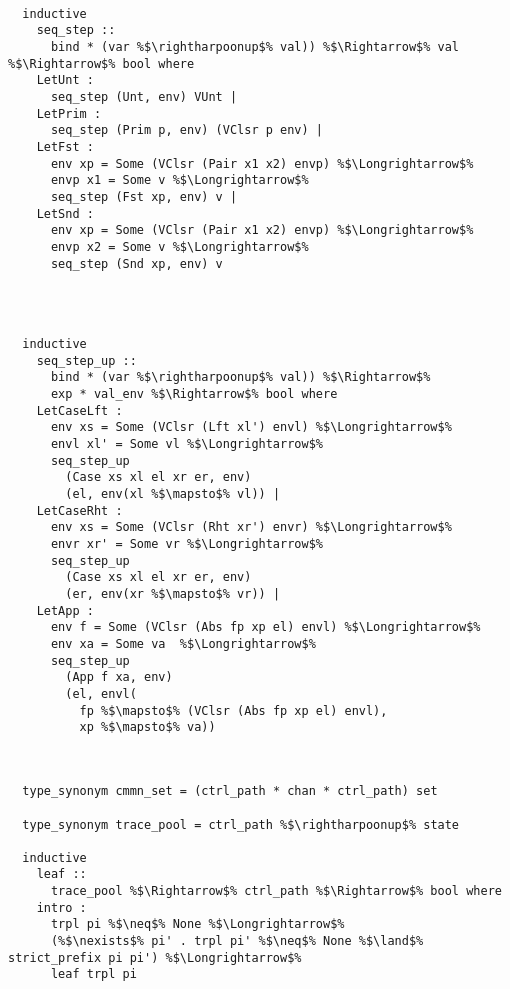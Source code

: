 \begin{lstlisting}[style=codestyle1, escapechar=\%]

  inductive
    seq_step ::
      bind * (var %$\rightharpoonup$% val)) %$\Rightarrow$% val %$\Rightarrow$% bool where
    LetUnt : 
      seq_step (Unt, env) VUnt |
    LetPrim :
      seq_step (Prim p, env) (VClsr p env) |
    LetFst :
      env xp = Some (VClsr (Pair x1 x2) envp) %$\Longrightarrow$%
      envp x1 = Some v %$\Longrightarrow$% 
      seq_step (Fst xp, env) v |
    LetSnd : 
      env xp = Some (VClsr (Pair x1 x2) envp) %$\Longrightarrow$%  
      envp x2 = Some v %$\Longrightarrow$% 
      seq_step (Snd xp, env) v


  \end{lstlisting}
\begin{lstlisting}[style=codestyle1, escapechar=\%]


  inductive
    seq_step_up ::
      bind * (var %$\rightharpoonup$% val)) %$\Rightarrow$%
      exp * val_env %$\Rightarrow$% bool where 
    LetCaseLft :
      env xs = Some (VClsr (Lft xl') envl) %$\Longrightarrow$%
      envl xl' = Some vl %$\Longrightarrow$%
      seq_step_up
        (Case xs xl el xr er, env)
        (el, env(xl %$\mapsto$% vl)) |
    LetCaseRht : 
      env xs = Some (VClsr (Rht xr') envr) %$\Longrightarrow$% 
      envr xr' = Some vr %$\Longrightarrow$%
      seq_step_up
        (Case xs xl el xr er, env)
        (er, env(xr %$\mapsto$% vr)) |
    LetApp :
      env f = Some (VClsr (Abs fp xp el) envl) %$\Longrightarrow$% 
      env xa = Some va  %$\Longrightarrow$% 
      seq_step_up
        (App f xa, env)
        (el, envl(
          fp %$\mapsto$% (VClsr (Abs fp xp el) envl),
          xp %$\mapsto$% va))

  \end{lstlisting}
\begin{lstlisting}[style=codestyle1, escapechar=\%]


  type_synonym cmmn_set = (ctrl_path * chan * ctrl_path) set

  type_synonym trace_pool = ctrl_path %$\rightharpoonup$% state

  inductive
    leaf ::
      trace_pool %$\Rightarrow$% ctrl_path %$\Rightarrow$% bool where
    intro :
      trpl pi %$\neq$% None %$\Longrightarrow$% 
      (%$\nexists$% pi' . trpl pi' %$\neq$% None %$\land$% strict_prefix pi pi') %$\Longrightarrow$%  
      leaf trpl pi

  \end{lstlisting}
